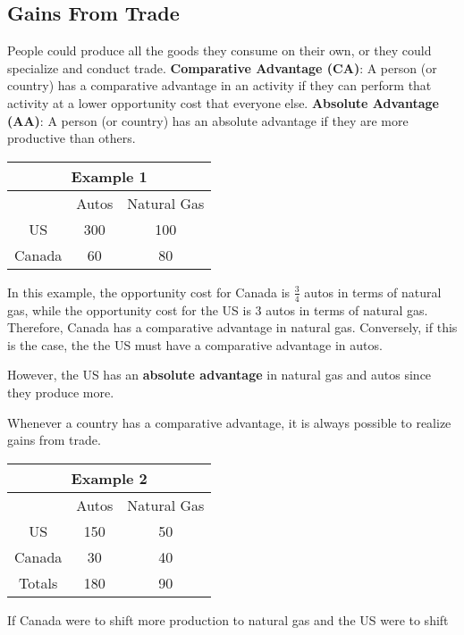 \documentclass[letterpaper, 12pt]{article}
\begin{document}
\subsection{Gains From Trade}
People could produce all the goods they consume on their own, or they could
specialize and conduct trade.
\newline
\textbf{Comparative Advantage (CA)}: A person (or country) has a comparative
advantage in an activity if they can perform that activity at a lower
opportunity cost that everyone else.
\newline
\textbf{Absolute Advantage (AA)}: A person (or country) has an absolute
advantage if they are more productive than others.
\begin{center}
  \begin{tabular}{|c|c|c|}
    \hline
    \multicolumn{3}{|c|}{Example 1} \\ \hline
           & Autos & Natural Gas  \\ \hline
    US     & 300 & 100            \\ \hline
    Canada & 60  & 80             \\ \hline
  \end{tabular}
\end{center}
In this example, the opportunity cost for Canada is \( \frac{3}{4} \) autos in
terms of natural gas, while the opportunity cost for the US is 3
autos in terms of natural gas. Therefore, Canada has a comparative advantage
in natural gas. Conversely, if this is the case, the the US must have a
comparative advantage in autos. \par
However, the US has an \textbf{absolute advantage} in natural gas and autos
since they produce more. \par
Whenever a country has a comparative advantage, it is always possible to
realize gains from trade.
\begin{center}
  \begin{tabular}{|c|c|c|}
    \hline
    \multicolumn{3}{|c|}{Example 2} \\ \hline
           & Autos & Natural Gas  \\ \hline
    US     & 150 & 50             \\ \hline
    Canada & 30  & 40             \\ \hline
    Totals & 180 & 90             \\ \hline
  \end{tabular}
\end{center}
If Canada were to shift more production to natural gas and the US were to shift
\end{document}
